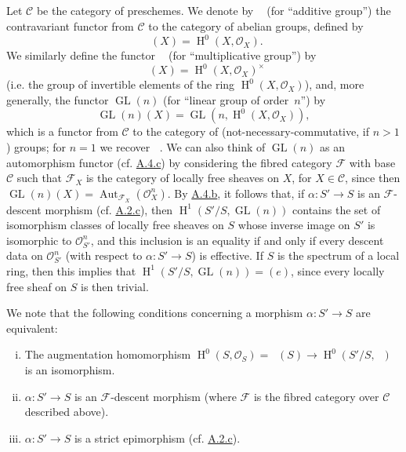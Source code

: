 \documentclass{article}
\theoremstyle{plain}
\theoremstyle{definition}
\newenvironment{example}[1]
  {\renewcommand\theinnercustomexample{#1}\innercustomexample}
  {\endinnercustomexample}
\newcommand{\sh}[1]{{\mathscr{#1}}}
\newcommand{\cat}[1]{{\mathcal{#1}}}
\DeclareMathOperator{\Aut}{Aut}
\DeclareMathOperator{\HH}{H}
\DeclareMathOperator{\GL}{GL}
\DeclareMathOperator{\Ga}{G_a}
\DeclareMathOperator{\Gm}{G_m}
\newcommand{\oldpage}[1]{\marginpar{\footnotesize$\Big\vert$ \textit{p.~#1}}}
\begin{document}
\subsection{}
\label{A.4.e}

\begin{example}{2}
  Let $\cat{C}$ be the category of preschemes.
  We denote by $\Ga$ (for ``additive group'') the contravariant functor from $\cat{C}$ to the category of abelian groups, defined by
  \[
    \Ga(X) = \HH^0(X,\sh{O}_X).
  \]
  We similarly define the functor $\Gm$ (for ``multiplicative group'') by
  \[
    \Gm(X) = \HH^0(X,\sh{O}_X)^\times
  \]
  (i.e. the group of invertible elements of the ring $\HH^0(X,\sh{O}_X)$), and, more generally, the functor $\GL(n)$ (for ``linear group of order~$n$'') by
\oldpage{190-15}
  \[
    \GL(n)(X) = \GL(n,\HH^0(X,\sh{O}_X)),
  \]
  which is a functor from $\cat{C}$ to the category of (not-necessary-commutative, if $n>1$) groups;
  for $n=1$ we recover $\Gm$.
  We can also think of $\GL(n)$ as an automorphism functor (cf. \hyperref[A.4.c]{A.4.c}) by considering the fibred category $\sh{F}$ with base $\cat{C}$ such that $\sh{F}_X$ is the category of locally free sheaves on $X$, for $X\in\cat{C}$, since then $\GL(n)(X)=\Aut_{\sh{F}_X}(\sh{O}_X^n)$.
  By \hyperref[A.4.b]{A.4.b}, it follows that, if $\alpha\colon S'\to S$ is an $\sh{F}$-descent morphism (cf. \hyperref[A.2.c]{A.2.c}), then $\HH^1(S'/S,\GL(n))$ contains the set of isomorphism classes of locally free sheaves on $S$ whose inverse image on $S'$ is isomorphic to $\sh{O}_{S'}^n$, and this inclusion is an equality if and only if every descent data on $\sh{O}_{S'}^n$ (with respect to $\alpha\colon S'\to S$) is effective.
  If $S$ is the spectrum of a local ring, then this implies that $\HH^1(S'/S,\GL(n))=(e)$, since every locally free sheaf on $S$ is then trivial.

  We note that the following conditions concerning a morphism $\alpha\colon S'\to S$ are equivalent:
  \begin{enumerate}[(i)]
    \item The augmentation homomorphism $\HH^0(S,\sh{O}_S) = \Ga(S)\to\HH^0(S'/S,\Ga)$ is an isomorphism.
    \item $\alpha\colon S'\to S$ is an $\sh{F}$-descent morphism (where $\sh{F}$ is the fibred category over $\cat{C}$ described above).
    \item $\alpha\colon S'\to S$ is a strict epimorphism (cf. \hyperref[A.2.c]{A.2.c}).
  \end{enumerate}


\end{example}
\end{document}
